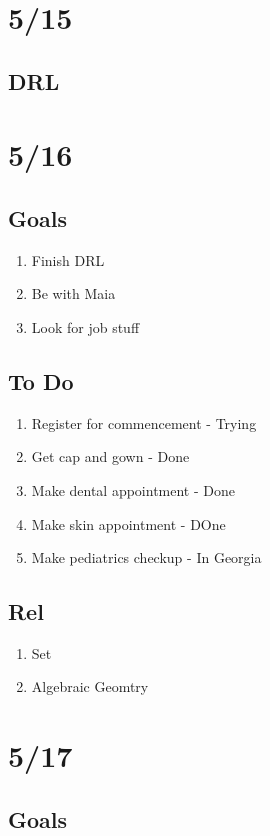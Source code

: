 \documentclass[11pt]{article}
\theoremstyle{remark}
\begin{document}
\section{5/15}

\subsection{DRL}

\section{5/16}

\subsection{Goals}

\begin{enumerate}
	\item Finish DRL
	\item Be with Maia
	\item Look for job stuff
\end{enumerate}

\subsection{To Do}

\begin{enumerate}
	\item Register for commencement - Trying
	\item Get cap and gown - Done
	\item Make dental appointment - Done
	\item Make skin appointment - DOne
	\item Make pediatrics checkup - In Georgia
\end{enumerate}

\subsection{Rel}

\begin{enumerate}
	\item Set
	\item Algebraic Geomtry
\end{enumerate}

\section{5/17}

\subsection{Goals}
\end{document}
